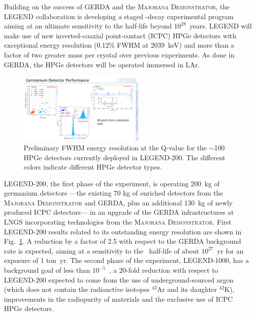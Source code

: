 Building on the success of GERDA and the \textsc{Majorana Demonstrator}, the LEGEND \cite{LEGEND:2021bnm} collaboration is developing a staged \bbonu-decay experimental program aiming at an ultimate sensitivity to the  half-life beyond $10^{28}$~years. 
LEGEND will make use of new inverted-coaxial point-contact (ICPC) HPGe detectors with exceptional energy resolution (0.12\% FWHM at 2039~keV) and more than a factor of two greater mass per crystal over previous experiments. As done in GERDA, the HPGe detectors will be operated immersed in LAr.

\begin{figure}[t!b!]
\begin{center}
\includegraphics[width=0.55\textwidth]{img/legend-200.pdf}
\end{center}
\caption{Preliminary FWHM energy resolution at the  Q-value for the $\sim$100 HPGe detectors currently deployed in LEGEND-200. The different colors indicate different HPGe detector types.}  \label{fig:legend-200}
\end{figure}

LEGEND-200, the first phase of the experiment, is operating 200~kg of germanium detectors ---\thinspace the existing 70 kg of enriched detectors from the \textsc{Majorana Demonstrator} and GERDA, plus an additional 130~kg of newly produced ICPC detectors\thinspace--- in an upgrade of the GERDA infrastructures at LNGS incorporating technologies from the \textsc{Majorana Demonstrator}. First LEGEND-200 results related to its outstanding energy resolution are shown in Fig.~\ref{fig:legend-200}. A reduction by a factor of 2.5 with respect to the GERDA background rate is expected, aiming at a sensitivity to the \bbonu\ half-life of about $10^{27}$~yr for  an exposure of 1 ton~yr. The second phase of the experiment, LEGEND-1000, has a background goal of less than $10^{-5}$~\ckky, a 20-fold reduction with respect to LEGEND-200 expected to come from the use of underground-sourced argon (which does not contain the radioactive isotopes $^{42}$Ar and its daughter $^{42}$K), improvements in the radiopurity of materials and the exclusive use of ICPC HPGe detectors.
